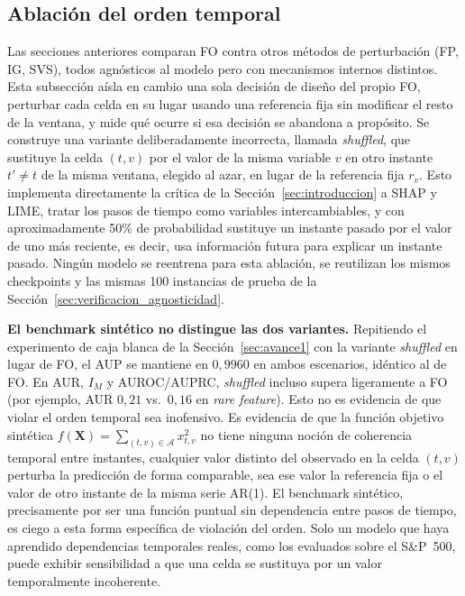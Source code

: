 \documentclass[conference, letterpaper]{IEEEtran}
\begin{document}
\subsection{Ablación del orden temporal}
\label{sec:ablacion_temporal}

Las secciones anteriores comparan FO contra otros métodos de
perturbación (FP, IG, SVS), todos agnósticos al modelo pero con
mecanismos internos distintos. Esta subsección aísla en cambio una
sola decisión de diseño del propio FO, perturbar cada celda en su
lugar usando una referencia fija sin modificar el resto de la
ventana, y mide qué ocurre si esa decisión se abandona a propósito.
Se construye una variante deliberadamente incorrecta, llamada
\emph{shuffled}, que sustituye la celda $(t,v)$ por el valor de la
misma variable $v$ en otro instante $t' \neq t$ de la misma ventana,
elegido al azar, en lugar de la referencia fija $r_v$. Esto
implementa directamente la crítica de la Sección~\ref{sec:introduccion}
a SHAP y LIME, tratar los pasos de tiempo como variables
intercambiables, y con aproximadamente 50\% de probabilidad sustituye
un instante pasado por el valor de uno más reciente, es decir, usa
información futura para explicar un instante pasado. Ningún modelo
se reentrena para esta ablación, se reutilizan los mismos checkpoints
y las mismas 100 instancias de prueba de la
Sección~\ref{sec:verificacion_agnosticidad}.

\textbf{El benchmark sintético no distingue las dos variantes.}
Repitiendo el experimento de caja blanca de la
Sección~\ref{sec:avance1} con la variante \emph{shuffled} en lugar de
FO, el AUP se mantiene en $0{,}9960$ en ambos escenarios, idéntico al
de FO. En AUR, $I_M$ y AUROC/AUPRC, \emph{shuffled} incluso supera
ligeramente a FO (por ejemplo, AUR $0{,}21$ vs.\ $0{,}16$ en
\textit{rare feature}). Esto no es evidencia de que violar el orden
temporal sea inofensivo. Es evidencia de que la función objetivo
sintética $f(\mathbf{X}) = \sum_{(t,v)\in\mathcal{A}} x_{t,v}^2$ no
tiene ninguna noción de coherencia temporal entre instantes, cualquier
valor distinto del observado en la celda $(t,v)$ perturba la
predicción de forma comparable, sea ese valor la referencia fija o el
valor de otro instante de la misma serie AR(1). El benchmark sintético,
precisamente por ser una función puntual sin dependencia entre pasos
de tiempo, es ciego a esta forma específica de violación del orden.
Solo un modelo que haya aprendido dependencias temporales reales,
como los evaluados sobre el S\&P~500, puede exhibir sensibilidad a
que una celda se sustituya por un valor temporalmente incoherente.
\end{document}
